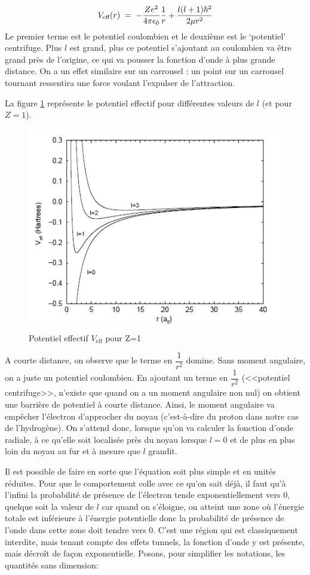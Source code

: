 \[
    V_\text{eff}(r)\; = \; -\dfrac{Ze^2}{4\pi \epsilon_0}\dfrac{1}{r}+\dfrac{l(l+1)\hbar^2}{2\mu r^2}
\]
Le premier terme est le potentiel coulombien et le deuxième est le `potentiel' centrifuge. Plus $l$ est grand, plus ce potentiel s'ajoutant au coulombien va être grand près de l'origine, ce qui va pousser la fonction d'onde à plus grande distance. On a un effet similaire sur un carrousel : un point sur un carrousel tournant ressentira une force voulant l'expulser de l'attraction.

La figure \ref{fig:potentieleffectif} représente le potentiel effectif pour différentes valeurs de $l$ (et pour $Z=1$).


\begin{figure}[tph]
    \centering
    \includegraphics[scale=0.80]{Images2/rad.PNG}
    \caption{Potentiel effectif $V_\text{eff}$ pour Z=1}
    \label{fig:potentieleffectif}
\end{figure}
A courte distance, on observe que le terme en $\dfrac{1}{r^2}$ domine. Sans moment angulaire, on a juste un potentiel coulombien. En ajoutant un terme en $\dfrac{1}{r^2}$ (<<potentiel centrifuge>>, n'existe que quand on a un moment angulaire non nul) on obtient une barrière de potentiel à courte distance. Ainsi, le moment angulaire va empêcher l'électron d'approcher du noyau (c'est-à-dire du proton dans notre cas de l'hydrogène). On s'attend donc, lorsque qu'on va calculer la fonction d'onde radiale, à ce qu'elle soit localisée près du noyau lorsque $l=0$ et de plus en plus loin du noyau au fur et à mesure que $l$ grandit. 

Il est possible de faire en sorte que l'équation soit plus simple et en unités réduites. Pour que le comportement colle avec ce qu'on sait déjà, il faut qu'à l'infini la probabilité de présence de l'électron tende exponentiellement vers 0, quelque soit la valeur de $l$ car quand on s'éloigne, on atteint une zone où l'énergie totale est inférieure à l'énergie potentielle donc la probabilité de présence de l'onde dans cette zone doit tendre vers 0. C'est une région qui est classiquement interdite, mais tenant compte des effets tunnels, la fonction d'onde y est présente, mais décroît de façon exponentielle. Posons, pour simplifier les notations, les quantités sans dimension:

